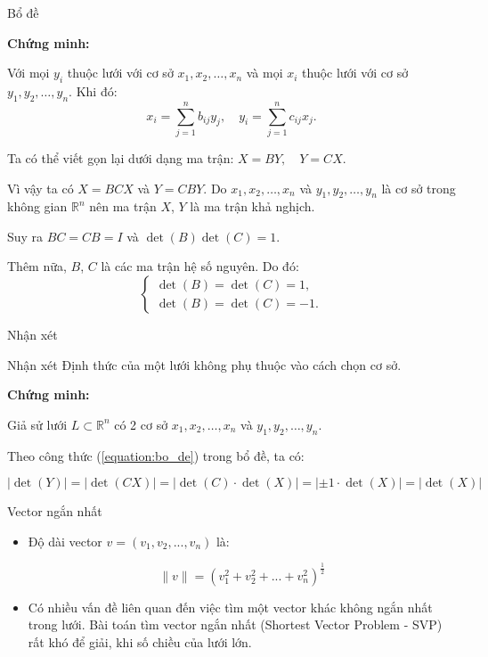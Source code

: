 \documentclass{beamer}
\numberwithin{equation}{section}
\begin{document}
\begin{frame}{Bổ đề}

\textbf{Chứng minh:}

Với mọi $y_i$ thuộc lưới với cơ sở $x_1, x_2, \ldots, x_n$ và mọi $x_i$ thuộc lưới với cơ sở $y_1, y_2, \ldots, y_n$. Khi đó:
\[
x_i = \sum_{j=1}^n b_{ij} y_j, \quad y_i = \sum_{j=1}^n c_{ij} x_j.
\]

Ta có thể viết gọn lại dưới dạng ma trận:
$X = BY, \quad Y = CX.$

Vì vậy ta có $X = BCX$ và $Y = CBY$. Do $x_1, x_2, \ldots, x_n$ và $y_1, y_2, \ldots, y_n$ là cơ sở trong không gian $\mathbb{R}^n$ nên ma trận $X$, $Y$ là ma trận khả nghịch.

Suy ra $BC = CB = I$ và $\det(B) \det(C) = 1$.

Thêm nữa, $B$, $C$ là các ma trận hệ số nguyên. Do đó:
\[
\begin{cases}
\det(B) = \det(C) = 1, \\
\det(B) = \det(C) = -1.
\end{cases}
\]

\end{frame}
\begin{frame}{Nhận xét}

\begin{block}{Nhận xét}
Định thức của một lưới không phụ thuộc vào cách chọn cơ sở.
\end{block}

\textbf{Chứng minh:}

Giả sử lưới $L \subset \mathbb{R}^n$ có 2 cơ sở $x_1, x_2, \ldots, x_n$ và $y_1, y_2, \ldots, y_n$.

Theo công thức (\ref{equation:bo_de}) trong bổ đề, ta có:

\[
|\det(Y)| = |\det(CX)| = |\det(C) \cdot \det(X)| = |\pm 1 \cdot \det(X)| = |\det(X)|
\]

\end{frame}
\begin{frame}{Vector ngắn nhất}

\begin{itemize}
\item Độ dài vector $v = (v_1, v_2, ..., v_n)$ là:

$$\|v\| = (v_1^2 + v_2^2 + ... + v_n^2)^{\tfrac{1}{2}}$$

\item Có nhiều vấn đề liên quan đến việc tìm một vector khác không ngắn nhất trong lưới.
Bài toán tìm vector ngắn nhất (Shortest Vector Problem - SVP) rất khó để giải, khi số chiều của lưới lớn.

\end{itemize}

\end{frame}
\end{document}
